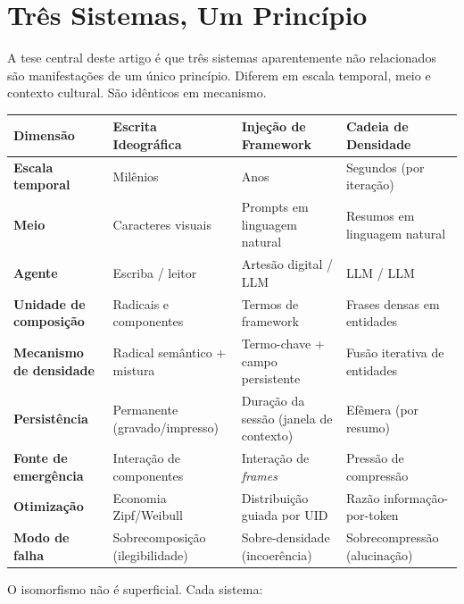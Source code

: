 \documentclass[12pt,a4paper]{article}
\begin{document}
\section{Três Sistemas, Um Princípio}
\label{sec:isomorphism}

A tese central deste artigo é que três sistemas aparentemente não relacionados são manifestações de um único princípio.
Diferem em escala temporal, meio e contexto cultural.
São idênticos em mecanismo.

\begin{center}
\begin{tabular}{p{3cm}p{3.5cm}p{3.5cm}p{3.5cm}}
\toprule
\textbf{Dimensão} & \textbf{Escrita Ideográfica} & \textbf{Injeção de Framework} & \textbf{Cadeia de Densidade} \\
\midrule
\textbf{Escala temporal} & Milênios & Anos & Segundos (por iteração) \\
\textbf{Meio} & Caracteres visuais & Prompts em linguagem natural & Resumos em linguagem natural \\
\textbf{Agente} & Escriba / leitor & Artesão digital / LLM & LLM / LLM \\
\textbf{Unidade de composição} & Radicais e componentes & Termos de framework & Frases densas em entidades \\
\textbf{Mecanismo de densidade} & Radical semântico + mistura & Termo-chave + campo persistente & Fusão iterativa de entidades \\
\textbf{Persistência} & Permanente (gravado/impresso) & Duração da sessão (janela de contexto) & Efêmera (por resumo) \\
\textbf{Fonte de emergência} & Interação de componentes & Interação de \textit{frames} & Pressão de compressão \\
\textbf{Otimização} & Economia Zipf/Weibull & Distribuição guiada por UID & Razão informação-por-token \\
\textbf{Modo de falha} & Sobrecomposição (ilegibilidade) & Sobre-densidade (incoerência) & Sobrecompressão (alucinação) \\
\bottomrule
\end{tabular}
\end{center}

O isomorfismo não é superficial.
Cada sistema:
\end{document}
